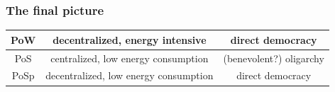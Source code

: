 \documentclass[11pt]{beamer}  %
\begin{document}
\begin{frame}\frametitle{The final picture}

  \begin{center}
    \begin{tabular}{c||c|c}
      PoW & decentralized, energy intensive & direct democracy \\\hline
      PoS & centralized, low energy consumption & (benevolent?) oligarchy \\\hline
      PoSp & decentralized, low energy consumption & direct democracy
    \end{tabular}
  \end{center}
  
\end{frame}
\end{document}

